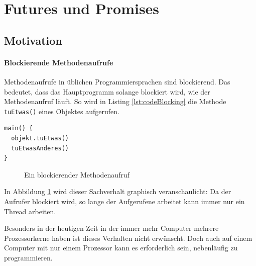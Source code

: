 \section{Futures und Promises}

\subsection{Motivation}

\paragraph{Blockierende Methodenaufrufe} Methodenaufrufe in üblichen Programmiersprachen sind blockierend. Das bedeutet,
dass das Hauptprogramm solange blockiert wird, wie der Methodenaufruf läuft.
So wird in Listing \ref{lst:codeBlocking} die Methode \texttt{tuEtwas()} eines Objektes aufgerufen.

\begin{lstlisting}[caption={Blockierender Methodenaufruf},label={lst:codeBlocking},captionpos=b]
main() {
  objekt.tuEtwas()
  tuEtwasAnderes()
}
\end{lstlisting}

\begin{figure}[htbp]
  \centering
  \caption{Ein blockierender Methodenaufruf }
  \label{blockingCall}
\end{figure}

In Abbildung \ref{blockingCall} wird dieser Sachverhalt graphisch
veranschaulicht: Da der Aufrufer blockiert wird, so lange der Aufgerufene
arbeitet kann immer nur ein Thread arbeiten.

Besonders in der heutigen Zeit in der immer mehr Computer mehrere
Prozessorkerne haben ist dieses Verhalten nicht erwünscht. Doch auch
auf einem Computer mit nur einem Prozessor kann es erforderlich sein,
nebenläufig zu programmieren.

